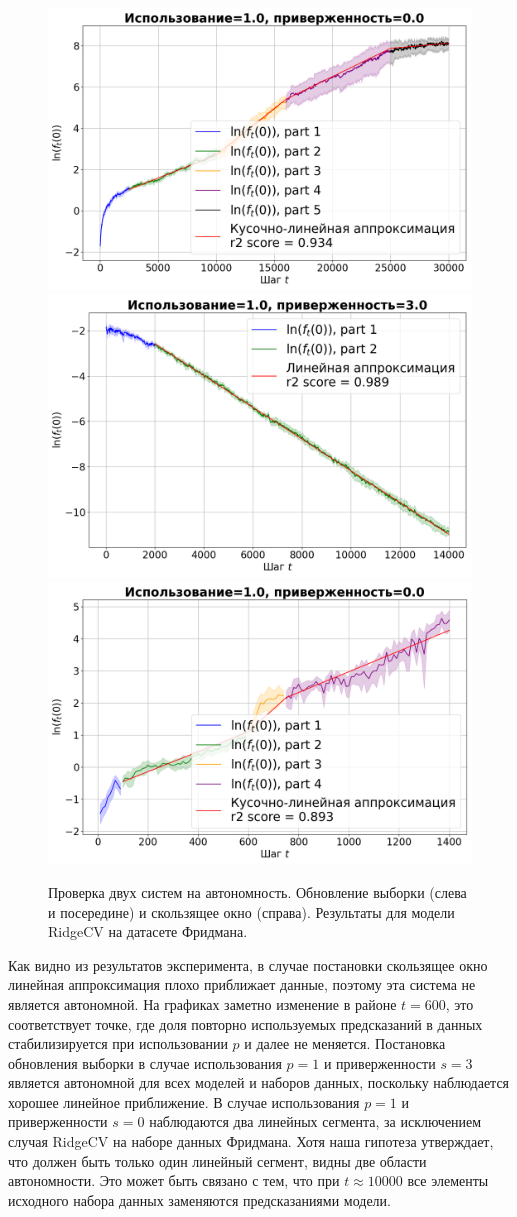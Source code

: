     \begin{figure}[h!]
        \centering
        \includegraphics[width=0.32\linewidth]{pictures/aut_su_friedman_ridgecv_model_1.0_0.0.png}
        \includegraphics[width=0.32\linewidth]{pictures/aut_su_friedman_ridgecv_model_1.0_3.0.png}
        \includegraphics[width=0.32\linewidth]{pictures/aut_sw_friedman_ridgecv_model_1.0_0.0.png}
        
        \caption{Проверка двух систем на автономность. Обновление выборки (слева и посередине) и скользящее окно (справа). Результаты для модели RidgeCV на датасете Фридмана.}
        \label{fig_exp_4_4}
    \end{figure}

    Как видно из результатов эксперимента, в случае постановки скользящее окно линейная аппроксимация плохо приближает данные, поэтому эта система не является автономной. На графиках заметно изменение в районе $t = 600$, это соответствует точке, где доля повторно используемых предсказаний в данных стабилизируется при использовании $p$ и далее не меняется. Постановка обновления выборки в случае использования $p = 1$ и приверженности $s = 3$ является автономной для всех моделей и наборов данных, поскольку наблюдается хорошее линейное приближение. В случае использования $p = 1$ и приверженности $s = 0$ наблюдаются два линейных сегмента, за исключением случая RidgeCV на наборе данных Фридмана. Хотя наша гипотеза утверждает, что должен быть только один линейный сегмент, видны две области автономности. Это может быть связано с тем, что при $t \approx 10000$ все элементы исходного набора данных заменяются предсказаниями модели.

